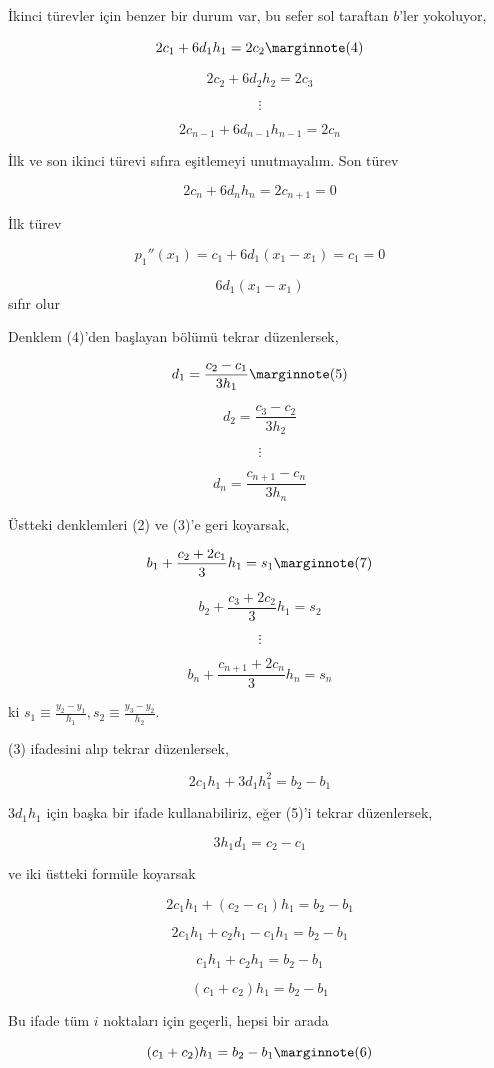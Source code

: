 \documentclass[12pt,fleqn]{article}\usepackage{../../common}
\begin{document}
İkinci türevler için benzer bir durum var, bu sefer sol taraftan $b$'ler
yokoluyor, 

$$ 2c_1 + 6d_1h_1 = 2c_2 
\mlabel{4} $$

$$ 2c_2 + 6d_2h_2 = 2c_3 $$

$$ \vdots $$

$$ 2c_{n-1} + 6d_{n-1}h_{n-1} = 2c_n $$

İlk ve son ikinci türevi sıfıra eşitlemeyi unutmayalım. Son türev

$$ 2c_n + 6d_nh_n = 2c_{n+1} = 0 $$

İlk türev

$$ p_1''(x_1) =  c_1 + 6d_1(x_1-x_1)  = c_1 = 0$$

$$ 6d_1(x_1-x_1) $$ sıfır olur

Denklem (4)'den başlayan bölümü tekrar düzenlersek, 

$$ d_1 = \frac{ c_2 - c_1}{3h_1} 
\mlabel{5} $$

$$ d_2 = \frac{ c_3 - c_2}{3h_2} $$

$$ \vdots $$

$$ d_n = \frac{ c_{n+1} - c_n}{3h_n} $$

Üstteki denklemleri (2) ve (3)'e geri koyarsak,

$$ b_1 + \frac{ c_2 + 2c_1}{3}h_1 = s_1 
\mlabel{7} $$

$$ b_2 + \frac{ c_3 + 2c_2}{3}h_1 = s_2 $$

$$ \vdots $$

$$ b_n + \frac{ c_{n+1} + 2c_n}{3}h_n = s_n $$

ki $s_1 \equiv \frac{y_2 - y_1}{h_1}, s_2 \equiv \frac{y_3 - y_2}{h_2}$. 

(3) ifadesini alıp tekrar düzenlersek, 

$$  2c_1h_1 + 3d_1h_1^2  = b_2 - b_1$$

$3d_1h_1$ için başka bir ifade kullanabiliriz, eğer (5)'i tekrar
düzenlersek,

$$ 3h_1d_1 = c_2 - c_1$$

ve iki üstteki formüle koyarsak

$$  2c_1h_1 + (c_2 - c_1)h_1  = b_2 - b_1$$

$$  2c_1h_1 + c_2h_1 - c_1h_1  = b_2 - b_1$$

$$  c_1h_1 + c_2h_1  = b_2 - b_1$$

$$  (c_1 + c_2) h_1  = b_2 - b_1$$

Bu ifade tüm $i$ noktaları için geçerli, hepsi bir arada

$$  (c_1 + c_2) h_1  = b_2 - b_1 
\mlabel{6}$$
\end{document}
